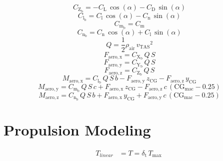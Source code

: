 \documentclass[lettersize,journal]{IEEEtran}
\begin{document}
{\begin{equation}
C_{\mathrm{Z}_{\mathrm{b}}}=-C_{\mathrm{L}}\,\cos\left(\alpha \right)-C_{\mathrm{D}}\,\sin\left(\alpha \right)
\end{equation}
\begin{equation}
C_{\mathrm{l}_{\mathrm{b}}}=C_{\mathrm{l}}\,\cos\left(\alpha \right)-C_{\mathrm{n}}\,\sin\left(\alpha \right)
\end{equation}
\begin{equation}
C_{\mathrm{m}_{\mathrm{b}}}=C_{\mathrm{m}}
\end{equation}
\begin{equation}
C_{\mathrm{n}_{\mathrm{b}}}=C_{\mathrm{n}}\,\cos\left(\alpha \right)+C_{\mathrm{l}}\,\sin\left(\alpha \right)
\end{equation}
\begin{equation}
Q=\frac{1}{2}\rho _{\mathrm{air}}\,{v_{\mathrm{TAS}}}^2
\end{equation}
\begin{equation}
F_{\mathrm{aero,x}}=C_{\mathrm{X}_{\mathrm{b}}}\,Q\,S
\end{equation}
\begin{equation}
F_{\mathrm{aero,y}}=C_{\mathrm{Y}_{\mathrm{b}}}\,Q\,S
\end{equation}
\begin{equation}
F_{\mathrm{aero,z}}=C_{\mathrm{Z}_{\mathrm{b}}}\,Q\,S
\end{equation}
\begin{equation}
M_{\mathrm{aero,x}}=C_{\mathrm{l}_{\mathrm{b}}}\,Q\,S\,b-F_{\mathrm{aero,y}}\,z_{\mathrm{CG}}-F_{\mathrm{aero,z}}\,y_{\mathrm{CG}}
\end{equation}
\begin{equation}
M_{\mathrm{aero,y}}=C_{\mathrm{m}_{\mathrm{b}}}\,Q\,S\,c+F_{\mathrm{aero,x}}\,z_{\mathrm{CG}}-F_{\mathrm{aero,z}}\,c\,\left(\mathrm{CG}_{\mathrm{mac}}-0.25\right)
\end{equation}
\begin{equation}
M_{\mathrm{aero,z}}=C_{\mathrm{n}_{\mathrm{b}}}\,Q\,S\,b+F_{\mathrm{aero,x}}\,y_{\mathrm{CG}}+F_{\mathrm{aero,y}}\,c\,\left(\mathrm{CG}_{\mathrm{mac}}-0.25\right)
\end{equation}

\section{Propulsion Modeling}\label{apdx:propulsion}

\begin{equation}
\begin{aligned}
T_{linear}&=T=\delta_{\mathrm{t}}\,T_{\mathrm{max}}\
\end{aligned}
\end{equation}

}
\end{document}
